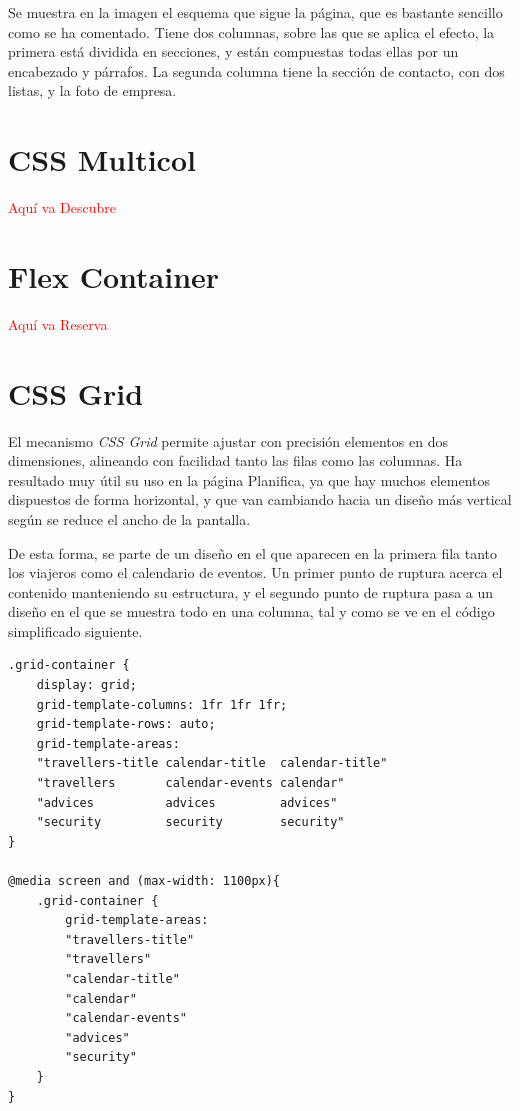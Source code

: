 \documentclass[11pt, a4paper]{book}
\begin{document}
	Se muestra en la imagen el esquema que sigue la página, que es bastante sencillo como se ha comentado. Tiene dos columnas, sobre las que se aplica el efecto, la primera está dividida en secciones, y están compuestas todas ellas por un encabezado y párrafos. La segunda columna tiene la sección de contacto, con dos listas, y la foto de empresa.

	
	\section{CSS Multicol}
	
	\begin{Huge}
		\textcolor{red}{Aquí va Descubre}
	\end{Huge}
	
	\section{Flex Container}
	
	\begin{Huge}
		\textcolor{red}{Aquí va Reserva}
	\end{Huge}

	\section{CSS Grid}
	El mecanismo \textit{CSS Grid} permite ajustar con precisión elementos en dos dimensiones, alineando con facilidad tanto las filas como las columnas. Ha resultado muy útil su uso en la página Planifica, ya que hay muchos elementos dispuestos de forma horizontal, y que van cambiando hacia un diseño más vertical según se reduce el ancho de la pantalla.
	
	De esta forma, se parte de un diseño en el que aparecen en la primera fila tanto los viajeros como el calendario de eventos. Un primer punto de ruptura acerca el contenido manteniendo su estructura, y el segundo punto de ruptura pasa a un diseño en el que se muestra todo en una columna, tal y como se ve en el código simplificado siguiente. 
	
	\begin{lstlisting}[]
.grid-container {
	display: grid;
	grid-template-columns: 1fr 1fr 1fr;
	grid-template-rows: auto;
	grid-template-areas:
	"travellers-title calendar-title  calendar-title"
	"travellers       calendar-events calendar"
	"advices          advices         advices"
	"security         security        security"
}

@media screen and (max-width: 1100px){
	.grid-container {
		grid-template-areas:
		"travellers-title"
		"travellers"
		"calendar-title"
		"calendar"
		"calendar-events"
		"advices"
		"security"
	}
}
	\end{lstlisting}
	
\end{document}
